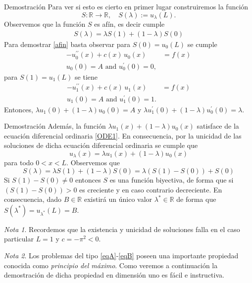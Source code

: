\documentclass[10pt,handout]{beamer}
\theoremstyle{plain} %
\theoremstyle{plain} %
\theoremstyle{plain} %
\theoremstyle{plain} %
\theoremstyle{definition}
\theoremstyle{example}
\theoremstyle{example}
\theoremstyle{remark}
\theoremstyle{remark}
\newtheorem{rem}{Nota}
\begin{document}
\begin{frame}{Demostración}
Para ver si esto es cierto en primer lugar construiremos la función 
$$
S:\mathbb{R} \longrightarrow \mathbb{R}, \quad S(\lambda):= u_{\lambda}(L).
$$
Observemos que la función $S$ es afín, es decir cumple
\begin{align}
S(\lambda) = \lambda S(1) + (1-\lambda)S(0) \label{afin}
\end{align}
Para demostrar \eqref{afin} basta observar para $S(0) = u_0(L)$ se cumple
\begin{align*}
- u_0^{\prime \prime}(x) + c(x)\,u_0(x) & = f(x)  \\ 
 u_0(0) = A  \text{ and } u_0^{\prime}(0) = 0, 
\end{align*}
para $S(1) = u_1(L)$ se tiene
\begin{align*}
- u_1^{\prime \prime}(x) + c(x)\,u_1(x) & = f(x)  \\ 
 u_1(0) = A  \text{ and } u_1^{\prime}(0) = 1. 
\end{align*}
Entonces, $\lambda u_1(0)  + (1-\lambda) u_0(0) = A$ y $\lambda u_1^{\prime}(0)  + (1-\lambda) u_0^{\prime}(0) = \lambda.$
\end{frame}

\begin{frame}{Demostración}
Además, la función $\lambda u_1(x) + (1-\lambda)u_0(x)$ satisface
de la ecuación diferencial ordinaria \eqref{ODE1}. En consecuencia, por la unicidad de las soluciones 
de dicha ecuación diferencial ordinaria se cumple que
$$
u_{\lambda}(x) = \lambda u_1(x) + (1-\lambda)u_0(x)
$$
para todo $0 < x < L.$ Observemos que
$$
S(\lambda) = \lambda S(1) + (1-\lambda)S(0) = \lambda (S(1) - S(0)) + S(0)
$$
Si $S(1) - S(0) \neq 0$ entonces $S$ es una función biyectiva, de forma que si $(S(1) - S(0)) > 0$
es creciente y en caso contrario decreciente. En consecuencia, dado $B \in \mathbb{R}$ existirá un único valor $\lambda^* \in \mathbb{R}$ de forma que $S(\lambda^*) = u_{\lambda^*}(L) = B.$
\end{frame}

\begin{frame}
\begin{rem}
Recordemos que la existencia y unicidad de soluciones falla en el caso particular $L=1$ y $c = -\pi^2 < 0.$
\end{rem}

\begin{rem}
Los problemas del tipo \eqref{eqA}-\eqref{eqB} poseen una importante propiedad conocida como \emph{principio del máximo}. Como veremos a continuación la demostración de dicha propiedad en dimensión uno es fácil e instructiva.
\end{rem}
\end{frame}
\end{document}
